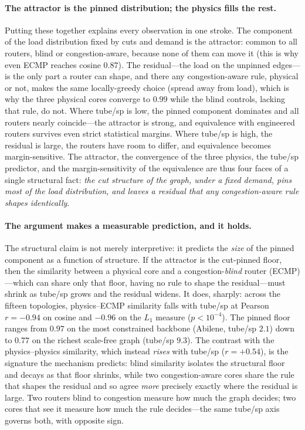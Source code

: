 \paragraph{The attractor is the pinned distribution; the physics fills the
rest.} Putting these together explains every observation in one stroke. The
component of the load distribution fixed by cuts and demand is the attractor:
common to all routers, blind or congestion-aware, because none of them can
move it (this is why even ECMP reaches cosine $0.87$). The residual---the load
on the unpinned edges---is the only part a router can shape, and there any
congestion-aware rule, physical or not, makes the same locally-greedy choice
(spread away from load), which is why the three physical cores converge to
$0.99$ while the blind controls, lacking that rule, do not. Where tube/sp is
low, the pinned component dominates and all routers nearly coincide---the
attractor is strong, and equivalence with engineered routers survives even
strict statistical margins. Where tube/sp is high, the residual is large, the
routers have room to differ, and equivalence becomes margin-sensitive. The
attractor, the convergence of the three physics, the tube/sp predictor, and the
margin-sensitivity of the equivalence are thus four faces of a single
structural fact: \emph{the cut structure of the graph, under a fixed demand,
pins most of the load distribution, and leaves a residual that any
congestion-aware rule shapes identically}.

\paragraph{The argument makes a measurable prediction, and it holds.} The
structural claim is not merely interpretive: it predicts the \emph{size} of the
pinned component as a function of structure. If the attractor is the cut-pinned
floor, then the similarity between a physical core and a congestion-\emph{blind}
router (ECMP)---which can share only that floor, having no rule to shape the
residual---must shrink as tube/sp grows and the residual widens.
It does, sharply: across the fifteen topologies, physics--ECMP similarity falls
with tube/sp at Pearson $r=-0.94$ on cosine and $-0.96$ on the $L_1$ measure
($p<10^{-4}$). The pinned floor ranges from $0.97$ on the most constrained
backbone (Abilene, tube/sp $2.1$) down to $0.77$ on the richest scale-free
graph (tube/sp $9.3$).
The contrast with the physics--physics similarity, which instead \emph{rises}
with tube/sp ($r=+0.54$), is the signature the mechanism predicts: blind
similarity isolates the structural floor and decays as that floor shrinks,
while two congestion-aware cores share the rule that shapes the residual and so
agree \emph{more} precisely exactly where the residual is large. Two routers
blind to congestion measure how much the graph decides; two cores that see it
measure how much the rule decides---the same tube/sp axis governs both, with
opposite sign.

